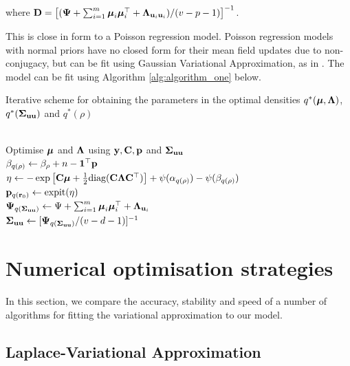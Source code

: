 \documentclass{article}[12pt]
\begin{document}
where ${\bf D} = \left[ ({\boldsymbol \Psi} + \sum_{i=1}^m {\boldsymbol \mu}_i {\boldsymbol \mu}_i^\top + {\boldsymbol \Lambda}_{{\bf u}_i{\bf u}_i}) / (v - p - 1) \right]^{-1}$. 

This is close in form to a Poisson regression model. Poisson regression models with normal priors have no
closed form for their mean field updates due to non- conjugacy, but can be fit using Gaussian Variational
Approximation, as in \citep{ormerod09}. The model can be fit using Algorithm \ref{alg:algorithm_one} below.

\begin{algorithm}
\caption[Algorithm 1]{Iterative scheme for obtaining the parameters in the
optimal densities $q^*({\boldsymbol \mu}, {\boldsymbol \Lambda})$, $q^*({\boldsymbol \Sigma}_{{\bf u} {\bf u}})$ and $q^*(\rho)$}
\label{alg:algorithm_one}
\begin{algorithmic}
 \\[1ex]
\STATE Optimise ${\boldsymbol \mu}$ and ${\boldsymbol \Lambda}$ using ${\bf y}, {\bf C}, {\bf p}$ and ${\boldsymbol \Sigma}_{{\bf u} {\bf u}}$ \\[1ex]
\STATE $\beta_{q(\rho)} \leftarrow \beta_\rho + n - {\bf 1}^\top{\bf p}$ \\[1ex]
\STATE $\eta \leftarrow -\exp \left [ {\bf C} {\boldsymbol \mu} + {\tfrac{1}{2}} \text{diag}{({\bf C}{\boldsymbol\Lambda}{\bf C}^\top)} \right ] + \psi{(\alpha_{q{(\rho)}})} - \psi{(\beta_{q{(\rho)}})}$ \\[1ex]
\STATE ${\bf p}_{q({\bf r}_0)} \leftarrow \text{expit} (\eta)$ \\[1ex]
\STATE ${\boldsymbol \Psi}_{q({\boldsymbol \Sigma}_{{\bf u} {\bf u}})} \leftarrow \Psi + \sum_{i=1}^m {\boldsymbol \mu}_i {\boldsymbol \mu}_i^\top + {\boldsymbol \Lambda}_{{{\bf u}}_i}$ \\[1ex]
\STATE ${\boldsymbol \Sigma}_{{\bf u}{\bf u}} \leftarrow [{\boldsymbol \Psi}_{q({\boldsymbol \Sigma}_{{\bf u} {\bf u}})}/(v - d - 1)]^{-1}$
\ENDWHILE
\end{algorithmic}
\end{algorithm}

\section{Numerical optimisation strategies}
\label{sec:algorithms}

In this section, we compare the accuracy, stability and speed of a number of algorithms for fitting the
variational approximation to our model.

\subsection{Laplace-Variational Approximation}
\end{document}
